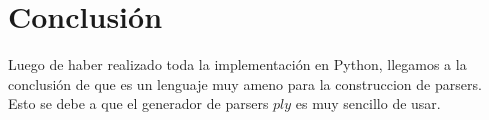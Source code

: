 \documentclass[a4paper, 10pt, twoside]{article}
\begin{document}

\section{Conclusión}

Luego de haber realizado toda la implementación en Python, llegamos a la conclusión de que es un lenguaje muy ameno para la construccion de parsers. Esto se debe a que el generador de parsers $ply$ es muy sencillo de usar.
\end{document}
